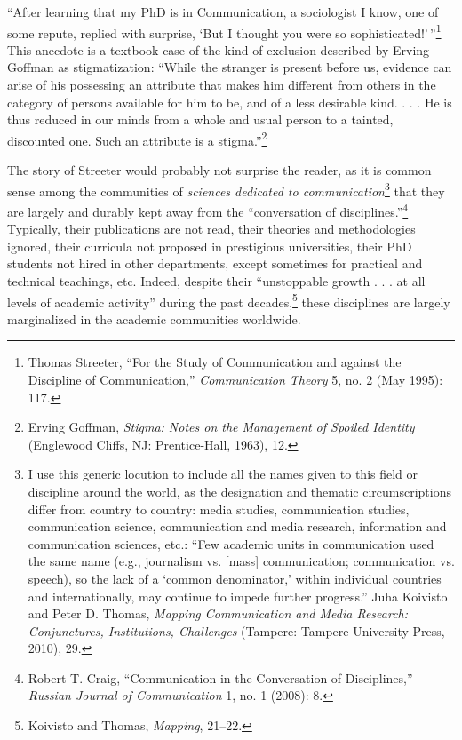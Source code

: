 \documentclass{tufte-handout}
\begin{document}
``After learning that my PhD is in Communication, a sociologist I know,
one of some repute, replied with surprise, `But I thought
you were so
sophisticated!'\,''\footnote{Thomas Streeter, ``For the Study of
  Communication and against the Discipline of Communication,''
  \emph{Communication Theory} 5, no. 2 (May 1995): 117.} This anecdote
is a textbook case of the kind of exclusion described by Erving Goffman
as stigmatization: ``While the stranger is present before us, evidence
can arise of his possessing an attribute that makes him different from
others in the category of persons available for him to be, and of a less
desirable kind. . . . He is thus reduced in our minds from a whole and
usual person to a tainted, discounted one. Such an attribute is a
stigma.''\footnote{Erving Goffman, \emph{Stigma: Notes on the Management
  of Spoiled Identity} (Englewood Cliffs, NJ: Prentice-Hall, 1963), 12.}
  
\enlargethispage{\baselineskip}

The story of Streeter would probably not surprise the reader, as it is
common sense among the communities of \emph{sciences dedicated to
communication}\footnote{I use this generic locution to include all the
  names given to this field or discipline around the world, as the
  designation and thematic circumscriptions differ from country to
  country: media studies, communication studies, communication science,
  communication and media research, information and communication
  sciences, etc.: ``Few academic units in communication used the same
  name (e.g., journalism vs. {[}mass{]} communication; communication vs.
  speech), so the lack of a `common denominator,' within individual
  countries and internationally, may continue to impede further
  progress.'' Juha Koivisto and Peter D. Thomas, \emph{Mapping
  Communication and Media Research: Conjunctures, Institutions,
  Challenges} (Tampere: Tampere University Press, 2010), 29.} that they
are largely and durably kept away from the ``conversation of
disciplines.''\footnote{Robert T. Craig, ``Communication in the
  Conversation of Disciplines,'' \emph{Russian Journal of Communication}
  1, no. 1 (2008): 8.} Typically, their publications are not read, their
theories and methodologies ignored, their curricula not proposed in
prestigious universities, their PhD students not hired in other
departments, except sometimes for practical and technical teachings,
etc. Indeed, despite their ``unstoppable growth . . . at all levels of
academic activity'' during the past decades,\footnote{Koivisto and
  Thomas, \emph{Mapping}, 21--22.} these disciplines are largely
marginalized in the academic communities worldwide.
\end{document}
